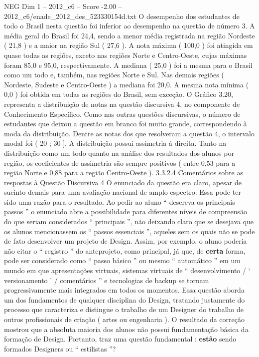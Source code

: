 \begin{textsample}{NEG Dim 1 – 2012\_c6 – Score -2.00 – 2012\_c6/enade\_2012\_des\_523330154d.txt}
O desempenho dos estudantes de todo o Brasil nesta questão foi inferior ao desempenho na questão de número 3.
A média geral do Brasil foi 24,4, sendo a menor média registrada na região Nordeste ( 21,8 ) e a maior na região Sul ( 27,6 ).
A nota máxima ( 100,0 ) foi atingida em quase todas as regiões, exceto nas regiões Norte e Centro-Oeste, cujas máximas foram 85,0 e 95,0, respectivamente.
A mediana ( 25,0 ) foi a mesma para o Brasil como um todo e, também, nas regiões Norte e Sul.
Nas demais regiões ( Nordeste, Sudeste e Centro-Oeste ) a mediana foi 20,0.
A mesma nota mínima ( 0,0 ) foi obtida em todas as regiões do Brasil, sem exceção.
O Gráfico 3.20, representa a distribuição de notas na questão discursiva 4, no componente de Conhecimento Específico.
Como nas outras questões discursivas, o número de estudantes que deixou a questão em branco foi muito grande, correspondendo à moda da distribuição.
Dentre as notas dos que resolveram a questão 4, o intervalo modal foi ( 20 ; 30 ].
A distribuição possui assimetria à direita.
Tanto na distribuição como um todo quanto na análise dos resultados dos alunos por região, os coeficientes de assimetria são sempre positivos ( entre 0,53 para a região Norte e 0,88 para a região Centro-Oeste ). 3.3.2.4 Comentários sobre as respostas à Questão Discursiva 4 O enunciado da questão era claro, apesar de sucinto demais para uma avaliação nacional de amplo espectro.
Essa pode ter sido uma razão para o resultado.
Ao pedir ao aluno “ descreva os principais passos ” o enunciado abre a possibilidade para diferentes níveis de compreensão do que seriam considerados “ principais ”, não deixando claro que se desejava que os alunos mencionassem os “ passos essenciais ”, aqueles sem os quais não se pode de fato desenvolver um projeto de Design.
Assim, por exemplo, o aluno poderia não citar o “ registro ” do anteprojeto, como principal, já que, de \textbf{certa} forma, pode ser considerado como “ passo básico ” ou mesmo “ automático ” em um mundo em que apresentações virtuais, sistemas virtuais de “ desenvolvimento / ‘ versionamento ’ / comentários ” e tecnologias de backup se tornam progressivamente mais integrados em todos os momentos.
Essa questão aborda um dos fundamentos de qualquer disciplina do Design, tratando justamente do processo que caracteriza e distingue o trabalho de um Designer do trabalho de outros profissionais de criação ( artes ou engenharia ).
O resultado da correção mostrou que a absoluta maioria dos alunos não possui fundamentação básica da formação de Design.
Portanto, traz uma questão fundamental : \textbf{estão} sendo formados Designers ou “ estilistas ”?

\end{textsample}
